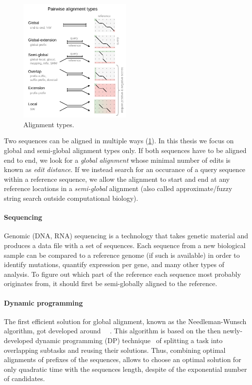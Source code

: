 \begin{figure}[t]  %
    \includegraphics[width=0.5\textwidth]{alignment-types}
	\caption[Alignment types]{Alignment types.}
    \label{fig:alignment-types}
\end{figure}
Two sequences can be aligned in multiple ways (\cref{fig:alignment-types}). In
this thesis we focus on global and semi-global alignment types only. If both
sequences have to be aligned end to end, we look for a \emph{global alignment}
whose minimal number of edits is known as \emph{edit distance}. If we instead
search for an occurance of a query sequence within a reference sequence, we
allow the alignment to start and end at any reference locations in a
\emph{semi-global} alignment (also called approximate/fuzzy string search
outside computational biology).

\paragraph{Sequencing}
Genomic (DNA, RNA) sequencing is a technology that takes genetic material and
produces a data file with a set of sequences. Each sequence from a new
biological sample can be compared to a reference genome (if such is available)
in order to identify mutations, quantify expression per gene, and many other
types of analysis. To figure out which part of the reference each sequence most
probably originates from, it should first be semi-globally aligned to the
reference.

\paragraph{Dynamic programming}
The first efficient solution for global alignment, known as the Needleman-Wunsch
algorithm, got developed around~\citeyear{vintsyuk1968speech}~
\cite{vintsyuk1968speech,needleman1970general}. This algorithm is based on the
then newly-developed dynamic programming (DP) technique~\cite{bellman1954theory}
of splitting a task into overlapping subtasks and reusing their solutions. Thus,
combining optimal alignments of prefixes of the sequences, allows to choose an
optimal solution for only quadratic time with the sequences length, despite of
the exponential number of candidates.

